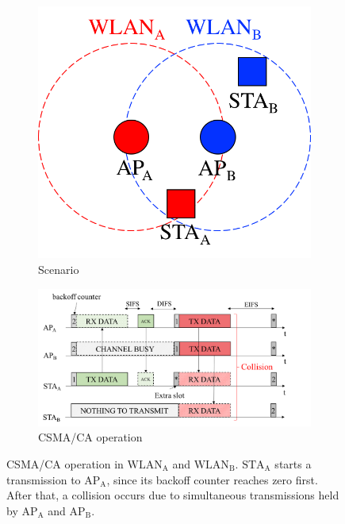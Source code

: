 \documentclass[preprint,12pt]{elsarticle}
\begin{document}
\begin{figure}[h!]
	\centering		
	\begin{subfigure}[b]{0.25\textwidth}
		\includegraphics[width=\textwidth]{csma_a}
		\caption{Scenario}\label{fig:csma_a}
	\end{subfigure}
	\begin{subfigure}[b]{0.55\textwidth}
		\includegraphics[width=\textwidth]{csma_b}
		\caption{CSMA/CA operation}\label{fig:csma_b}
	\end{subfigure}
	\caption{CSMA/CA operation in $\text{WLAN}_{\text{A}}$ and $\text{WLAN}_{\text{B}}$. $\text{STA}_{\text{A}}$ starts a transmission to $\text{AP}_{\text{A}}$, since its backoff counter reaches zero first. After that, a collision occurs due to simultaneous transmissions held by $\text{AP}_{\text{A}}$ and $\text{AP}_{\text{B}}$.}
	\label{fig:csma}
\end{figure}
\end{document}
